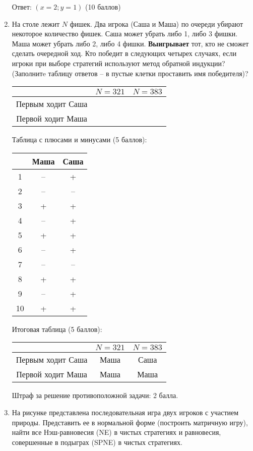 \documentclass[pdftex,12pt,a4paper]{article}
\begin{document}
\begin{enumerate}
Ответ: $(x=2;y=1)$ (10 баллов)

\item На столе лежит $N$ фишек. Два игрока (Саша и Маша) по очереди убирают некоторое количество фишек. Саша может убрать либо 1, либо 3 фишки. Маша может убрать либо 2, либо 4 фишки. \textbf{Выигрывает} тот, кто не сможет сделать очередной ход. Кто победит в следующих четырех случаях, если игроки при выборе стратегий используют метод обратной индукции? (Заполнитe таблицу ответов – в пустые клетки проставить имя победителя)?

\begin{tabular}{c|cc}
 & $N=321$ & $N=383$ \\ 
\hline 
Первым ходит Саша &  &  \\ 
Первой ходит Маша &  &  \\ 
\end{tabular} 



Таблица с плюсами и минусами (5 баллов): \\
\begin{tabular}{c|cc}
 & Маша & Саша \\ 
\hline 
1 & -- & + \\ 
2 & -- & -- \\ 
3 & + & + \\ 
4 & -- & + \\ 
5 & + & + \\ 
6 & -- & + \\ 
7 & -- & -- \\ 
8 & + & + \\ 
9 & -- & + \\ 
10 & + & + \\ 
\end{tabular} 

Итоговая таблица (5 баллов): \\
\begin{tabular}{c|cc}
 & $N=321$ & $N=383$ \\ 
\hline 
Первым ходит Саша & Маша & Саша \\ 
Первой ходит Маша & Маша &  Маша \\ 
\end{tabular} 


Штраф за решение противоположной задачи: 2 балла.

\item На рисунке представлена последовательная игра двух игроков с участием природы. Представить ее в нормальной форме (построить матричную игру), найти все Нэш-равновесия (NE) в чистых стратегиях и равновесия, совершенные в подыграх (SPNE) в чистых стратегиях.  



\end{enumerate}
\end{document}
